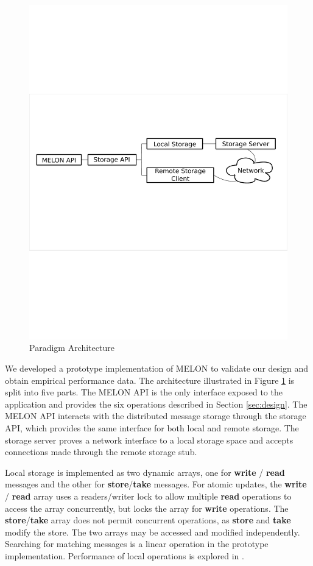 \documentclass{llncs}
\begin{document}
\begin{figure}
\centering
\includegraphics[scale = .45, clip, trim = 10px 350px 10px 312px]{figures/paradigm_arch.pdf}
\caption{Paradigm Architecture}
\label{fig:architecture}
\end{figure}

We developed a prototype implementation of MELON to validate our design and obtain empirical performance data. The architecture illustrated in Figure \ref{fig:architecture} is split into five parts. The MELON API is the only interface exposed to the application and provides the six operations described in Section \ref{sec:design}. The MELON API interacts with the distributed message storage through the storage API, which provides the same interface for both local and remote storage. The storage server proves a network interface to a local storage space and accepts connections made through the remote storage stub.

Local storage is implemented as two dynamic arrays, one for \textbf{write} / \textbf{read} messages and the other for \textbf{store}/\textbf{take} messages. For atomic updates, the \textbf{write} / \textbf{read} array uses a readers/writer lock to allow multiple \textbf{read} operations to access the array concurrently, but locks the array for \textbf{write} operations. The \textbf{store}/\textbf{take} array does not permit concurrent operations, as \textbf{store} and \textbf{take} modify the store. The two arrays may be accessed and modified independently. Searching for matching messages is a linear operation in the prototype implementation. Performance of local operations is explored in \cite{melon}.
\end{document}
